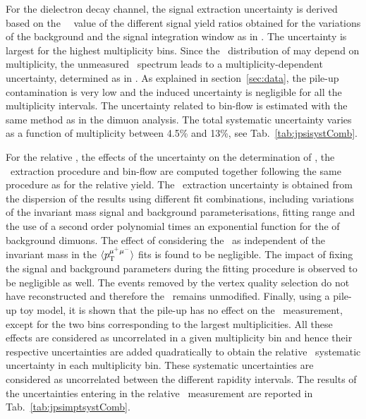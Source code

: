 For the dielectron decay channel, the signal extraction uncertainty is derived based on the \rms  ~~value of the  different signal yield ratios  obtained for the variations of the background  and the signal integration window as in \cite{Adam:2015jsa}.  The uncertainty is largest for the highest multiplicity bins. Since the \pt ~distribution of \jpsi may depend on multiplicity, the unmeasured \pt ~spectrum leads to a multiplicity-dependent uncertainty, determined as in \cite{Adam:2015jsa}. As explained in section~\ref{sec:data}, the pile-up contamination is very low and the induced uncertainty is negligible for all the multiplicity intervals.
The uncertainty related to bin-flow is estimated with the same method as in the dimuon analysis.
The total systematic uncertainty varies as a function of multiplicity between 4.5\% and 13\%, see Tab.~\ref{tab:jpsisystComb}.


For the relative \jpsi \mpt, the effects of the uncertainty on the determination of \acef, the \mpt ~extraction procedure and bin-flow are computed together following the same procedure as for the relative yield. The \mpt ~extraction uncertainty is obtained from the dispersion of the results using different fit combinations, including variations of the invariant mass signal and background parameterisations, fitting range and the use of a second order polynomial times an exponential function for the \mpt of background dimuons. The effect of considering the \jpsi \mpt ~as independent of the invariant mass in the $\langle p_{\rm{T}}^{\mu^{+}\mu^{-}} \rangle$ fits is found to be negligible. The impact of fixing the signal and background parameters during the fitting procedure is observed to be negligible as well. The events removed by the vertex quality selection do not have reconstructed \jpsi and therefore the \mpt ~remains unmodified. Finally, using a pile-up toy model, it is shown that the pile-up has no effect on the \mpt ~measurement, except for the two bins corresponding to the largest multiplicities. All these effects are considered as uncorrelated in a given multiplicity bin and hence their respective uncertainties are added quadratically to obtain the relative \mpt ~systematic uncertainty in each multiplicity bin. These systematic uncertainties are considered as uncorrelated between the different rapidity intervals. The results of the uncertainties entering in the relative \mpt ~measurement are reported in Tab.~\ref{tab:jpsimptsystComb}. 

